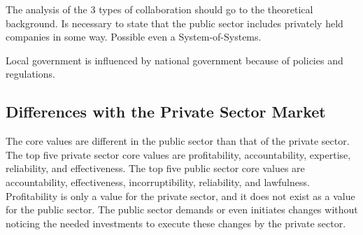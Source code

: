 \begin{remark}
	The analysis of the 3 types of collaboration should go to the theoretical background. Is necessary to state that the public sector includes privately held companies in some way. Possible even a System-of-Systems.
\end{remark}

\begin{remark}
	Local government is influenced by national government because of policies and regulations.
\end{remark}
\subsection{Differences with the Private Sector Market}
\label{sub:tbdifferenceprivatesector}

The core values are different in the public sector than that of the private sector. The top five private sector core values are profitability, accountability, expertise, reliability, and effectiveness. The top five public sector core values are accountability, effectiveness, incorruptibility, reliability, and lawfulness. \parencite{Wal2008} Profitability is only a value for the private sector, and it does not exist as a value for the public sector.  The public sector demands or even initiates changes without noticing the needed investments to execute these changes by the private sector.

